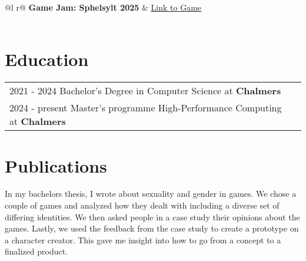 \documentclass[a4paper,12pt]{article}
\begin{document}
\begin{tabularx}{\linewidth}{ @{}l r@{} }
\textbf{Game Jam: Sphelsylt 2025} & \hfill \href{https://github.com/Titanothere/Sphelsylt-LV1-LP4-2025}{Link to Game} \\[3.75pt]
  \\
\end{tabularx}


\section{Education}
\begin{tabularx}{\linewidth}{@{}l X@{}}	
2021 - 2024 Bachelor's Degree in Computer Science at \textbf{Chalmers} \\
2024 - present Master's programme High-Performance Computing at \textbf{Chalmers}  \\
\end{tabularx}

\section{Publications}
\begin{refsection}
\nocite{*}
\printbibliography[heading=none]
\end{refsection}

In my bachelors thesis, I wrote about sexuality and gender in games. We chose a couple of games and analyzed how they dealt with including a diverse set of differing identities. We then asked people in a case study their opinions about the games. Lastly, we used the feedback from the case study to create a prototype on a character creator. This gave me insight into how to go from a concept to a finalized product.
\end{document}
